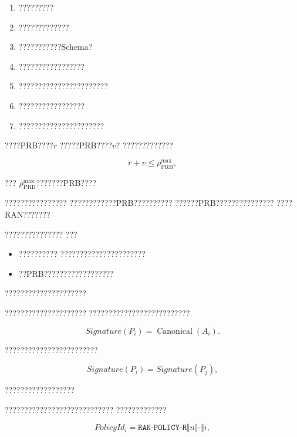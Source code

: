 \begin{enumerate}[label=\arabic*)]
    \item ?????????
    \item ?????????????
    \item ???????????Schema?
    \item ?????????????????
    \item ???????????????????????
    \item ?????????????????
    \item ??????????????????????
\end{enumerate}

????PRB????$r$
?????PRB????$v$?
?????????????

\begin{equation}
r+v
\leq
\rho_{\mathrm{PRB}}^{\max},
\label{eq:static_prb_constraint_reduced}
\end{equation}

???
$\rho_{\mathrm{PRB}}^{\max}$???????PRB????

????????????????
????????????PRB??????????
??????PRB???????????????
????RAN???????

???????????????
???

\begin{itemize}
    \item ??????????
    ??????????????????????
    \item ??PRB??????????????????
\end{itemize}

?????????????????????

?????????????????????
??????????????????????????

\begin{equation}
Signature(P_i)
=
\operatorname{Canonical}
\left(
A_i
\right).
\label{eq:policy_signature_reduced}
\end{equation}

????????????????????????

\begin{equation}
Signature(P_i)
=
Signature(P_j),
\label{eq:duplicate_policy_reduced}
\end{equation}

??????????????????

????????????????????????????
?????????????

\begin{equation}
PolicyId_i
=
\texttt{RAN-POLICY-R}
\Vert n
\Vert
\texttt{-}
\Vert i,
\label{eq:policy_identifier_reduced}
\end{equation}

